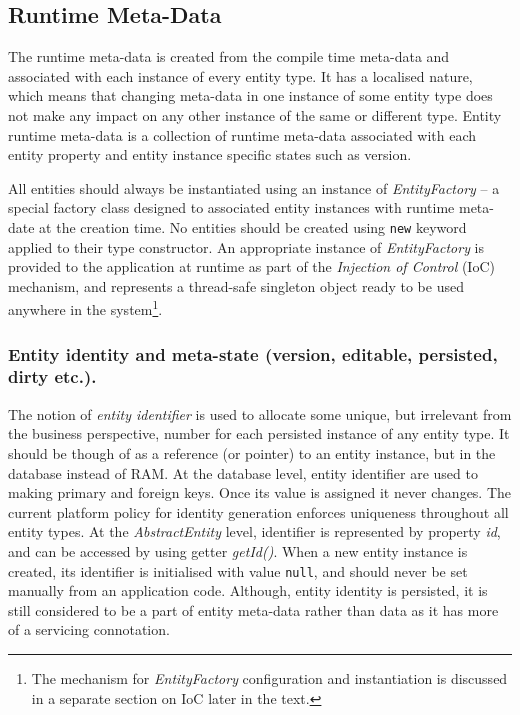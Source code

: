 \subsection{Runtime Meta-Data}

  The runtime meta-data is created from the compile time meta-data and associated with each instance of every entity type.
  It has a localised nature, which means that changing meta-data in one instance of some entity type does not make any impact on any other instance of the same or different type.
  Entity runtime meta-data is a collection of runtime meta-data associated with each entity property and entity instance specific states such as version.
  
  All entities should always be instantiated using an instance of \emph{EntityFactory} -- a special factory class designed to associated entity instances with runtime meta-date at the creation time.  
  No entities should be created using \texttt{new} keyword applied to their type constructor.
  An appropriate instance of \emph{EntityFactory} is provided to the application at runtime as part of the \emph{Injection of Control} (IoC) mechanism, and represents a thread-safe singleton object ready to be used anywhere in the system\footnote{The mechanism for \emph{EntityFactory} configuration and instantiation is discussed in a separate section on IoC later in the text.}.
  
  \subsubsection*{Entity identity and meta-state (version, editable, persisted, dirty etc.).}

  The notion of \emph{entity identifier} is used to allocate some unique, but irrelevant from the business perspective, number for each persisted instance of any entity type.
  It should be though of as a reference (or pointer) to an entity instance, but in the database instead of RAM.
  At the database level, entity identifier are used to making primary and foreign keys.
  Once its value is assigned it never changes.
  The current platform policy for identity generation enforces uniqueness throughout all entity types.
  At the \emph{AbstractEntity} level, identifier is represented by property \emph{id}, and can be accessed by using getter \emph{getId()}.
  When a new entity instance is created, its identifier is initialised with value \texttt{null}, and should never be set manually from an application code.
  Although, entity identity is persisted, it is still considered to be a part of entity meta-data rather than data as it has more of a servicing connotation.

